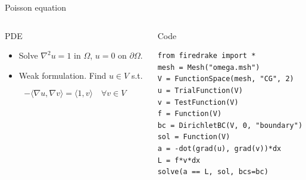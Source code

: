 \documentclass[presentation]{beamer}
\begin{document}
\begin{frame}[fragile,label=sec-3-1]{Poisson equation}
 \begin{columns}
\begin{column}{0.45\textwidth}
\begin{block}{PDE}

\begin{itemize}
\item Solve $\nabla^2 u = 1$ in $\Omega$, $u=0$ on $\partial\Omega$.
\item Weak formulation.  Find $u \in V$ s.t.
\end{itemize}
\begin{equation*}
-\langle\nabla u, \nabla v\rangle = \langle 1, v \rangle \quad \forall v \in V
\end{equation*}

\end{block}
\end{column}
\begin{column}{0.55\textwidth}
\begin{block}{Code}

\begin{verbatim}
from firedrake import *
mesh = Mesh("omega.msh")
V = FunctionSpace(mesh, "CG", 2)
u = TrialFunction(V)
v = TestFunction(V)
f = Function(V)
bc = DirichletBC(V, 0, "boundary")
sol = Function(V)
a = -dot(grad(u), grad(v))*dx
L = f*v*dx
solve(a == L, sol, bcs=bc)
\end{verbatim}
\end{block}
\end{column}
\end{columns}
\end{frame}
\end{document}
